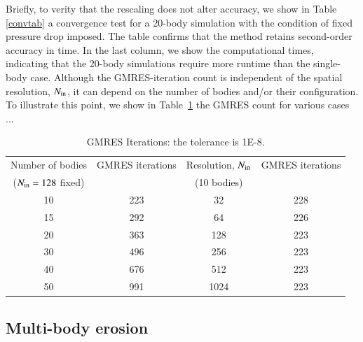 \documentclass[preprint, 10pt]{elsarticle}
\begin{document}
Briefly, to verity that the rescaling does not alter accuracy, we show in Table \ref{convtab} a convergence test for a 20-body simulation with the condition of fixed pressure drop imposed. The table confirms that the method retains second-order accuracy in time. In the last column, we show the computational times, indicating that the 20-body simulations require more runtime than the single-body case. Although the GMRES-iteration count is independent of the spatial resolution, $N_{\mathrm{in}}$, it can depend on the number of bodies and/or their configuration. To illustrate this point, we show in Table~\ref{itertab} the GMRES count for various cases ...

\begin{table}%
\begin{center}
\caption{GMRES Iterations: the tolerance is 1E-8.
}
\vspace{0.3 pc}
\label{itertab}
\begin{tabular}{c c | c c}
\hline
\hspace{0.5pc} Number of bodies
\hspace{0.5pc} & GMRES iterations 
\hspace{0.5pc} & Resolution, $N_{\mathrm{in}}$
\hspace{0.5pc} & GMRES iterations  \\
\hspace{0.0pc} ($N_{\mathrm{in}} = 128$ fixed) & 
\hspace{0.5pc} &(10 bodies) & \\
\hline
%
10	& 223	& 32	    	& 228	\\
15	& 292	& 64    	& 226	\\
20	& 363	& 128	& 223	\\
30	& 496	& 256	& 223	\\
40	& 676	& 512	& 223	\\
50	& 991	& 1024	& 223	\\
%
\hline
\end{tabular}
\end{center}
\end{table}

\subsection{Multi-body erosion}
\end{document}

